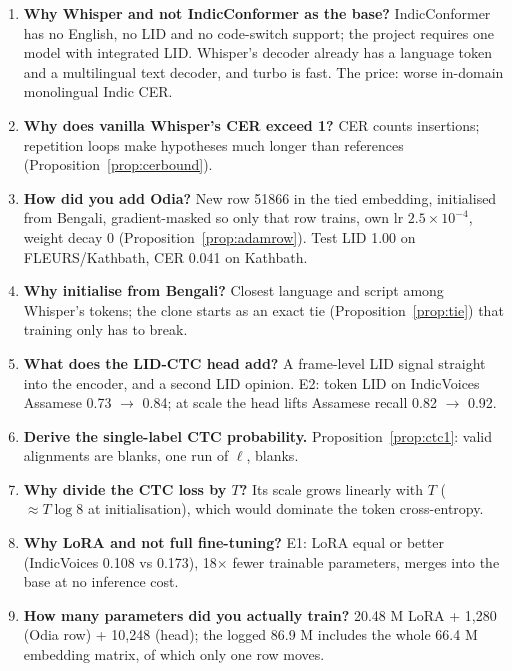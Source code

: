 \begin{enumerate}[leftmargin=*,label=\textbf{Q\arabic*.}]
\item \textbf{Why Whisper and not IndicConformer as the base?} IndicConformer has no English, no LID and no code-switch support; the
project requires one model with integrated LID. Whisper's decoder already has a language token and a multilingual text decoder,
and turbo is fast. The price: worse in-domain monolingual Indic CER.

\item \textbf{Why does vanilla Whisper's CER exceed 1?} CER counts insertions; repetition loops make hypotheses much longer than
references (Proposition~\ref{prop:cerbound}).

\item \textbf{How did you add Odia?} New row 51866 in the tied embedding, initialised from Bengali, gradient-masked so only that row
trains, own lr $2.5\times10^{-4}$, weight decay 0 (Proposition~\ref{prop:adamrow}). Test LID 1.00 on FLEURS/Kathbath, CER 0.041 on
Kathbath.

\item \textbf{Why initialise from Bengali?} Closest language and script among Whisper's tokens; the clone starts as an exact tie
(Proposition~\ref{prop:tie}) that training only has to break.

\item \textbf{What does the LID-CTC head add?} A frame-level LID signal straight into the encoder, and a second LID opinion. E2: token
LID on IndicVoices Assamese 0.73 $\to$ 0.84; at scale the head lifts Assamese recall 0.82 $\to$ 0.92.

\item \textbf{Derive the single-label CTC probability.} Proposition~\ref{prop:ctc1}: valid alignments are blanks, one run of $\ell$,
blanks.

\item \textbf{Why divide the CTC loss by $T$?} Its scale grows linearly with $T$ ($\approx T\log 8$ at initialisation), which would
dominate the token cross-entropy.

\item \textbf{Why LoRA and not full fine-tuning?} E1: LoRA equal or better (IndicVoices 0.108 vs 0.173), 18$\times$ fewer trainable
parameters, merges into the base at no inference cost.

\item \textbf{How many parameters did you actually train?} 20.48 M LoRA + 1{,}280 (Odia row) + 10{,}248 (head); the logged 86.9 M includes
the whole 66.4 M embedding matrix, of which only one row moves.


\end{enumerate}
